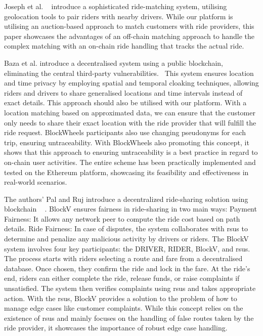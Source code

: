 Joseph et al. ~\cite{Joseph.} introduce a sophisticated ride-matching system, utilising geolocation tools to pair riders with nearby drivers. While our platform is utilising an auction-based approach to match customers with ride providers, this paper showcases the advantages of an off-chain matching approach to handle the complex matching with an on-chain ride handling that tracks the actual ride.

Baza et al. introduce a decentralised system using a public blockchain, eliminating the central third-party vulnerabilities.~\cite{Baza.52520205282020} This system ensures location and time privacy by employing spatial and temporal cloaking techniques, allowing riders and drivers to share generalised locations and time intervals instead of exact details. This approach should also be utilised with our platform. With a location matching based on approximated data, we can ensure that the customer only needs to share their exact location with the ride provider that will fulfill the ride request.
BlockWheels participants also use changing pseudonyms for each trip, ensuring untraceability. With BlockWheels also promoting this concept, it shows that this approach to ensuring untraceability is a best practice in regard to on-chain user activities. The entire scheme has been practically implemented and tested on the Ethereum platform, showcasing its feasibility and effectiveness in real-world scenarios.

The authors' Pal and Ruj introduce a decentralized ride-sharing solution using blockchain ~\cite{Pal.} . BlockV ensures fairness in ride-sharing in two main ways:
Payment Fairness: It allows any network peer to compute the ride cost based on path details.
Ride Fairness: In case of disputes, the system collaborates with \gls{rsus} to determine and penalize any malicious activity by drivers or riders.
The BlockV system involves four key participants: the DRIVER, RIDER, BlockV, and \gls{rsus}. The process starts with riders selecting a route and fare from a decentralised database. Once chosen, they confirm the ride and lock in the fare. At the ride's end, riders can either complete the ride, release funds, or raise complaints if unsatisfied. The system then verifies complaints using \gls{rsus} and takes appropriate action.
With the \gls{rsus}, BlockV provides a solution to the problem of how to manage edge cases like customer complaints. While this concept relies on the existence of \gls{rsus} and mainly focuses on the handling of false routes taken by the ride provider, it showcases the importance of robust edge case handling.

